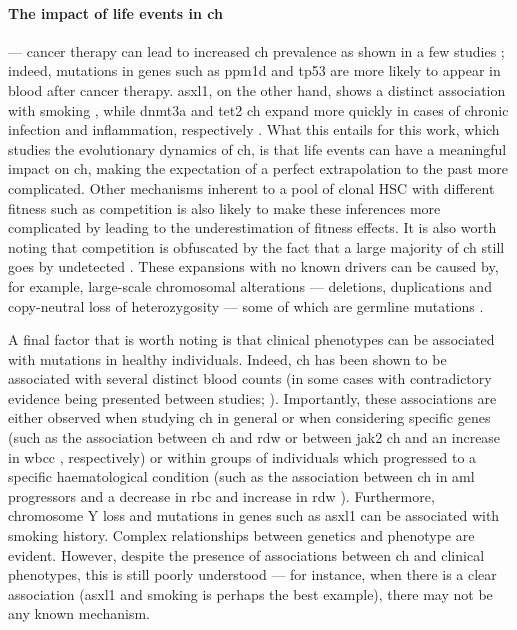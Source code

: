 \paragraph{The impact of life events in \ac{ch}} ---  cancer therapy can lead to increased \ac{ch} prevalence as shown in a few studies \cite{Bolton2020-ct,Zehir2017-gh}; indeed, mutations in genes such as \ac{ppm1d} and \ac{tp53} are more likely to appear in blood after cancer therapy. \Ac{asxl1}, on the other hand, shows a distinct association with smoking \cite{Dawoud2020-af}, while \ac{dnmt3a} and \ac{tet2} \ac{ch} expand more quickly in cases of chronic infection and inflammation, respectively \cite{Hormaechea-Agulla2021-kr,Cook2020-xs}. What this entails for this work, which studies the evolutionary dynamics of \ac{ch}, is that life events can have a meaningful impact on \ac{ch}, making the expectation of a perfect extrapolation to the past more complicated. Other mechanisms inherent to a pool of clonal HSC with different fitness such as competition is also likely to make these inferences more complicated \cite{Beerenwinkel2007-us} by leading to the underestimation of fitness effects. It is also worth noting that competition is obfuscated by the fact that a large majority of \ac{ch} still goes by undetected \cite{Poon2020-ek,Zink2017-zi,Genovese2014-eu}. These expansions with no known drivers can be caused by, for example, large-scale chromosomal alterations --- deletions, duplications and copy-neutral loss of heterozygosity --- some of which are germline mutations \cite{Loh2020-vz,Loh2018-xp,Gao2021-ph,Terao2020-dd}.

A final factor that is worth noting is that clinical phenotypes can be associated with mutations in healthy individuals. Indeed, \ac{ch} has been shown to be associated with several distinct blood counts (in some cases with contradictory evidence being presented between studies; ). Importantly, these associations are either observed when studying \ac{ch} in general or when considering specific genes (such as the association between \ac{ch} and \ac{rdw} \cite{Jaiswal2014-rl,Dawoud2020-af} or between \ac{jak2} \ac{ch} and an increase in \ac{wbcc} \cite{Cordua2019-mo}, respectively) or within groups of individuals which progressed to a specific haematological condition (such as the association between \ac{ch} in \ac{aml} progressors and a decrease in \ac{rbc} and increase in \ac{rdw} \cite{Abelson2018-wh}). Furthermore, chromosome Y loss \cite{Dumanski2015-ze} and mutations in genes such as \ac{asxl1} \cite{Dawoud2020-af} can be associated with smoking history. Complex relationships between genetics and phenotype are evident. However, despite the presence of associations between \ac{ch} and clinical phenotypes, this is still poorly understood --- for instance, when there is a clear association (\ac{asxl1} and smoking is perhaps the best example), there may not be any known mechanism.

